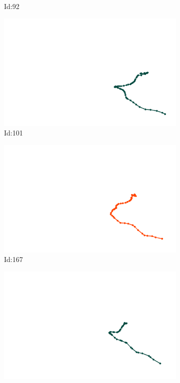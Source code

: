\documentclass[12pt,twoside]{report}
\begin{document}
\begin{figure}
\begin{subfigure}[b]{0.20\textwidth}
\caption{Id:92}
\end{subfigure}
\begin{subfigure}[b]{0.20\textwidth}
\centering
\includegraphics[width=\textwidth]{../trajectories/101.png}
\caption{Id:101}
\end{subfigure}
\begin{subfigure}[b]{0.20\textwidth}
\centering
\includegraphics[width=\textwidth]{../trajectories/167.png}
\caption{Id:167}
\end{subfigure}
\begin{subfigure}[b]{0.20\textwidth}
\centering
\includegraphics[width=\textwidth]{../trajectories/171.png}

\end{subfigure}
\end{figure}
\end{document}

